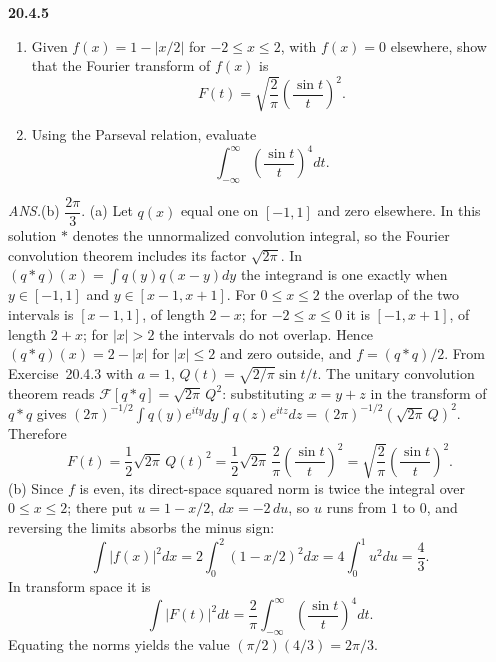 \par\bigskip
\noindent\textbf{20.4.5}
\begin{enumerate}
\item[(a)] Given $f(x)=1-|x/2|$ for $-2\le x\le2$, with $f(x)=0$
elsewhere, show that the Fourier transform of $f(x)$ is
\[
F(t)=\sqrt{\frac{2}{\pi}}\left(\frac{\sin t}{t}\right)^{2}.
\]
\item[(b)] Using the Parseval relation, evaluate
\[
\int_{-\infty}^{\infty}\left(\frac{\sin t}{t}\right)^{4}dt.
\]
\end{enumerate}
\par\nobreak\hfill\emph{ANS.}\enspace(b) $\dfrac{2\pi}{3}$.
\solution
(a) Let $q(x)$ equal one on $[-1,1]$ and zero
elsewhere. In this solution $*$ denotes the unnormalized
convolution integral, so the Fourier convolution theorem includes
its factor $\sqrt{2\pi}$. In
$(q*q)(x)=\int q(y)q(x-y)dy$ the integrand is one exactly when
$y\in[-1,1]$ and $y\in[x-1,x+1]$. For $0\le x\le2$ the overlap
of the two intervals is $[x-1,1]$, of length $2-x$; for
$-2\le x\le0$ it is $[-1,x+1]$, of length $2+x$; for $|x|>2$
the intervals do not overlap. Hence $(q*q)(x)=2-|x|$ for
$|x|\le2$ and zero outside, and $f=(q*q)/2$.
From Exercise~20.4.3 with $a=1$, $Q(t)=\sqrt{2/\pi}\sin t/t$.
The unitary convolution theorem reads
$\mathcal F[q*q]=\sqrt{2\pi}\,Q^2$: substituting $x=y+z$ in the
transform of $q*q$ gives
$(2\pi)^{-1/2}\int q(y)e^{ity}dy\int q(z)e^{itz}dz
=(2\pi)^{-1/2}(\sqrt{2\pi}\,Q)^2$. Therefore
\[
F(t)=\frac12\sqrt{2\pi}\,Q(t)^2
=\frac12\sqrt{2\pi}\,\frac2\pi\left(\frac{\sin t}{t}\right)^2
=\boxed{\sqrt{\frac2\pi}\left(\frac{\sin t}{t}\right)^2}.
\]
(b) Since $f$ is even, its direct-space squared norm is twice the
integral over $0\le x\le2$; there put $u=1-x/2$, $dx=-2\,du$, so
$u$ runs from $1$ to $0$, and reversing the limits absorbs the minus
sign:
\[
\int|f(x)|^2dx=2\int_0^2(1-x/2)^2dx
=4\int_0^1u^2du=\frac43.
\]
In transform space it is
\[
\int|F(t)|^2dt=\frac2\pi\int_{-\infty}^{\infty}
\left(\frac{\sin t}{t}\right)^4dt.
\]
Equating the norms yields the value
$\boxed{(\pi/2)(4/3)=2\pi/3}$.


